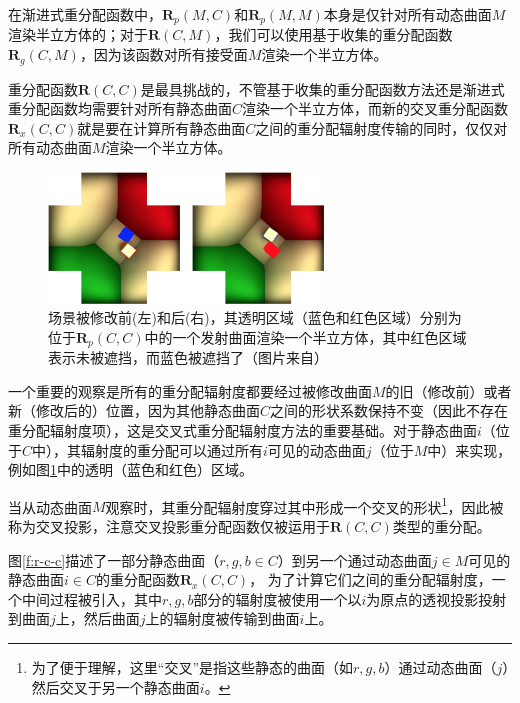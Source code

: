 在渐进式重分配函数中，$\mathbf{R}_p(M,C)$和$\mathbf{R}_p(M,M)$本身是仅针对所有动态曲面$M$渲染半立方体的；对于$\mathbf{R}(C,M)$，我们可以使用基于收集的重分配函数$\mathbf{R}_g(C,M)$，因为该函数对所有接受面$M$渲染一个半立方体。

重分配函数$\mathbf{R}(C,C)$是最具挑战的，不管基于收集的重分配函数方法还是渐进式重分配函数均需要针对所有静态曲面$C$渲染一个半立方体，而新的交叉重分配函数$\mathbf{R}_x(C,C)$就是要在计算所有静态曲面$C$之间的重分配辐射度传输的同时，仅仅对所有动态曲面$M$渲染一个半立方体。

\begin{figure}
	\sidecaption
		\includegraphics[width=0.65\textwidth]{figures/r/path-38}
	\caption{场景被修改前(左)和后(右)，其透明区域（蓝色和红色区域）分别为位于$\mathbf{R}_p(C,C)$中的一个发射曲面渲染一个半立方体，其中红色区域表示未被遮挡，而蓝色被遮挡了（图片来自\cite{a:Real-TimeDynamicRadiosityforHighQualityGlobalIllumination}）}
	\label{f:r-two-hemicubes}
\end{figure}

一个重要的观察是所有的重分配辐射度都要经过被修改曲面$M$的旧（修改前）或者新（修改后的）位置，因为其他静态曲面$C$之间的形状系数保持不变（因此不存在重分配辐射度项），这是交叉式重分配辐射度方法的重要基础。对于静态曲面$i$（位于$C$中），其辐射度的重分配可以通过所有$i$可见的动态曲面$j$（位于$M$中）来实现，例如图\ref{f:r-two-hemicubes}中的透明（蓝色和红色）区域。

当从动态曲面$M$观察时，其重分配辐射度穿过其中形成一个交叉的形状\footnote{为了便于理解，这里“交叉”是指这些静态的曲面（如$r,g,b$）通过动态曲面（$j$）然后交叉于另一个静态曲面$i$。}，因此被称为交叉投影，注意交叉投影重分配函数仅被运用于$\mathbf{R}(C,C)$类型的重分配。

图\ref{f:r-c-c}描述了一部分静态曲面（$r,g,b\in C$）到另一个通过动态曲面$j\in M$可见的静态曲面$i\in C$的重分配函数$\mathbf{R}_x(C,C)$， 为了计算它们之间的重分配辐射度，一个中间过程被引入，其中$r,g,b$部分的辐射度被使用一个以$i$为原点的透视投影投射到曲面$j$上，然后曲面$j$上的辐射度被传输到曲面$i$上。

